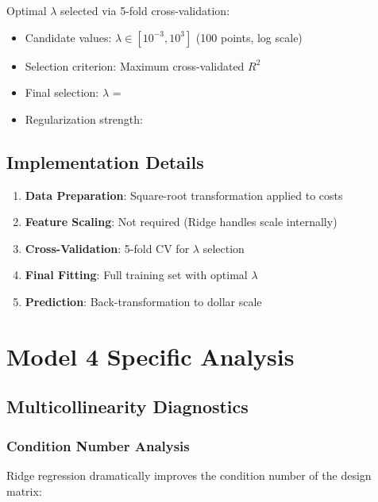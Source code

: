 Optimal $\lambda$ selected via 5-fold cross-validation:
\begin{itemize}
    \item Candidate values: $\lambda \in [10^{-3}, 10^{3}]$ (100 points, log scale)
    \item Selection criterion: Maximum cross-validated $R^2$
    \item Final selection: $\lambda$ = \ModelFourAlpha{}
    \item Regularization strength: \ModelFourRegularizationStrength{}
\end{itemize}

\subsection{Implementation Details}

\begin{enumerate}
    \item \textbf{Data Preparation}: Square-root transformation applied to costs
    \item \textbf{Feature Scaling}: Not required (Ridge handles scale internally)
    \item \textbf{Cross-Validation}: 5-fold CV for $\lambda$ selection
    \item \textbf{Final Fitting}: Full training set with optimal $\lambda$
    \item \textbf{Prediction}: Back-transformation to dollar scale
\end{enumerate}



\section{Model 4 Specific Analysis}

\subsection{Multicollinearity Diagnostics}

\subsubsection{Condition Number Analysis}

Ridge regression dramatically improves the condition number of the design matrix:

